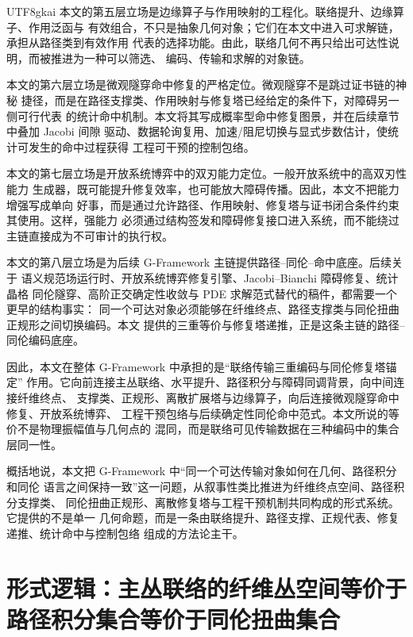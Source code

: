 \documentclass[12pt]{article}
\newcommand{\GFramework}{\textsf{G-Framework}}
\begin{document}
\begin{CJK*}{UTF8}{gkai}
本文的第五层立场是边缘算子与作用映射的工程化。联络提升、边缘算子、作用泛函与
有效组合，不只是抽象几何对象；它们在本文中进入可求解链，承担从路径类到有效作用
代表的选择功能。由此，联络几何不再只给出可达性说明，而被推进为一种可以筛选、
编码、传输和求解的对象链。

本文的第六层立场是微观隧穿命中修复的严格定位。微观隧穿不是跳过证书链的神秘
捷径，而是在路径支撑类、作用映射与修复塔已经给定的条件下，对障碍另一侧可行代表
的统计命中机制。本文将其写成概率型命中修复图景，并在后续章节中叠加 Jacobi 间隙
驱动、数据轮询复用、加速/阻尼切换与显式步数估计，使统计可发生的命中过程获得
工程可干预的控制包络。

本文的第七层立场是开放系统博弈中的双刃能力定位。一般开放系统中的高双刃性能力
生成器，既可能提升修复效率，也可能放大障碍传播。因此，本文不把能力增强写成单向
好事，而是通过允许路径、作用映射、修复塔与证书闭合条件约束其使用。这样，强能力
必须通过结构签发和障碍修复接口进入系统，而不能绕过主链直接成为不可审计的执行权。

本文的第八层立场是为后续 \GFramework{} 主链提供路径--同伦--命中底座。后续关于
语义规范场运行时、开放系统博弈修复引擎、Jacobi--Bianchi 障碍修复、统计晶格
同伦隧穿、高阶正交确定性收敛与 PDE 求解范式替代的稿件，都需要一个更早的结构事实：
同一个可达对象必须能够在纤维终点、路径支撑类与同伦扭曲正规形之间切换编码。本文
提供的三重等价与修复塔递推，正是这条主链的路径--同伦编码底座。

因此，本文在整体 \GFramework{} 中承担的是“联络传输三重编码与同伦修复塔锚定”
作用。它向前连接主丛联络、水平提升、路径积分与障碍同调背景，向中间连接纤维终点、
支撑类、正规形、离散扩展塔与边缘算子，向后连接微观隧穿命中修复、开放系统博弈、
工程干预包络与后续确定性同伦命中范式。本文所说的等价不是物理振幅值与几何点的
混同，而是联络可见传输数据在三种编码中的集合层同一性。

概括地说，本文把 \GFramework{} 中“同一个可达传输对象如何在几何、路径积分和同伦
语言之间保持一致”这一问题，从叙事性类比推进为纤维终点空间、路径积分支撑类、
同伦扭曲正规形、离散修复塔与工程干预机制共同构成的形式系统。它提供的不是单一
几何命题，而是一条由联络提升、路径支撑、正规代表、修复递推、统计命中与控制包络
组成的方法论主干。

\setcounter{tocdepth}{3}
\setcounter{secnumdepth}{3}
\tableofcontents
\clearpage

\section{形式逻辑：主丛联络的纤维丛空间等价于路径积分集合等价于同伦扭曲集合}
\label{sec:tex36-ch1}


\end{CJK*}
\end{document}
